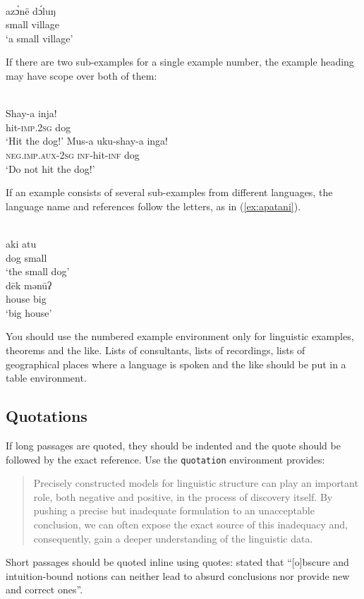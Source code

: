 {\def\exfont{\normalsize\itshape}
\ea\label{ex-typology}
\\
\gll azɔ́në dɔ́luŋ\\
     small village\\ 
\glt `a small village' 
\z


If there are two sub-examples for a single example number, the example heading may have scope over both of them:

\ea
{}\\
\ea
\gll Shay-a		inja!\\
hit-\textsc{imp.2sg}	dog\\
\glt `Hit the dog!'
\ex
\gll	Mus-a	uku-shay-a	inga! \\
	\textsc{neg.imp.aux-2sg}	\textsc{inf}-hit-\textsc{inf}	dog \\
\glt		`Do not hit the dog!'	
\z
\z

If an example consists of several sub-examples from different languages, the language name and references follow the letters, as in (\ref{ex:apatani}).

\ea\label{ex:apatani}
\ea
{}\\
\gll aki atu\\ 
     dog small\\ 
\glt ‘the small dog’ 
\ex 
{}\\ 
\gll dēk mənūʔ\\
     house big\\
\glt ‘big house’ 
\z
\z

You should use the numbered example environment only for linguistic examples, theorems and the like. Lists of consultants, lists of recordings, lists of geographical places where a language is spoken and the like should be put in a table environment. 


\subsection{Quotations}

If long passages are quoted, they should be indented and the quote should be followed by the exact reference. Use the \verb+quotation+ environment \latex provides:
\begin{quote}
Precisely constructed models for linguistic structure can play an
important role, both negative and positive, in the process of discovery 
itself. By pushing a precise but inadequate formulation to
an unacceptable conclusion, we can often expose the exact source
of this inadequacy and, consequently, gain a deeper understanding
of the linguistic data.
\citep[5]{Chomsky57a}
\end{quote}
%
Short passages should be quoted inline using quotes: \citet[5]{Chomsky57a} stated that ``[o]bscure
  and intuition-bound notions can neither lead to absurd conclusions nor provide new and
correct ones''.

}
